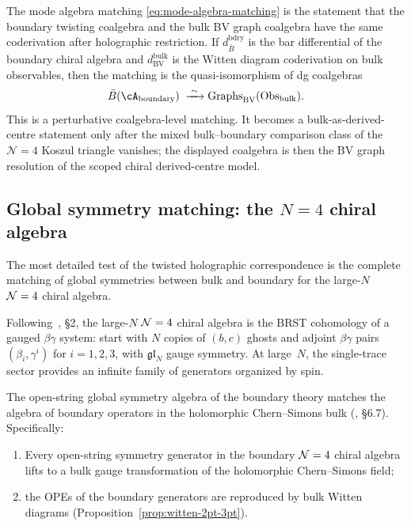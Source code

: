 \begin{remark}
The mode algebra matching \eqref{eq:mode-algebra-matching} is the
statement that the boundary twisting coalgebra and the bulk BV graph
coalgebra have the same coderivation after holographic restriction. If
$d_{\bar{B}}^{\mathrm{bdry}}$ is the bar differential of the boundary
chiral algebra and $d_{\mathrm{BV}}^{\mathrm{bulk}}$ is the Witten
diagram coderivation on bulk observables, then the matching is the
quasi-isomorphism of dg coalgebras
\[
 \bar{B}(\cA_{\mathrm{boundary}})
 \;\xrightarrow{\;\sim\;}
 \mathrm{Graphs}_{\mathrm{BV}}(\Obs_{\mathrm{bulk}}).
\]
This is a perturbative coalgebra-level matching. It becomes a
bulk-as-derived-centre statement only after the mixed
bulk--boundary comparison class of the $\mathcal N=4$ Koszul
triangle vanishes; the displayed coalgebra is then the BV graph
resolution of the scoped chiral derived-centre model.
\end{remark}

\subsection{Global symmetry matching: the \texorpdfstring{$N\!=\!4$}{N=4} chiral algebra}

The most detailed test of the twisted holographic correspondence is the
complete matching of global symmetries between bulk and boundary for the
large-$N$ $\N=4$ chiral algebra.

\begin{definition}[Large-$N$ $\N=4$ chiral algebra; \ClaimStatusProvedElsewhere]
Following~\cite{CG18}, \S2, the large-$N$ $\N=4$ chiral algebra is the
BRST cohomology of a gauged $\beta\gamma$ system: start with
$N$ copies of $(b,c)$ ghosts and adjoint $\beta\gamma$ pairs
$(\beta_i, \gamma^i)$ for $i = 1,2,3$, with $\mathfrak{gl}_N$ gauge
symmetry. At large~$N$, the single-trace sector provides an infinite
family of generators organized by spin.
\end{definition}

\begin{proposition}
The open-string global symmetry algebra of the boundary theory matches
the algebra of boundary operators in the holomorphic Chern--Simons bulk
\textup{(}\!\cite{CG18}, \S6.7\textup{)}. Specifically:
\begin{enumerate}[label=\textup{(\roman*)}]
\item Every open-string symmetry generator in the boundary $\N=4$
 chiral algebra lifts to a bulk gauge transformation of the
 holomorphic Chern--Simons field;
\item the OPEs of the boundary generators are reproduced by
 bulk Witten diagrams \textup{(}Proposition~\textup{\ref{prop:witten-2pt-3pt})}.
\end{enumerate}
\end{proposition}

